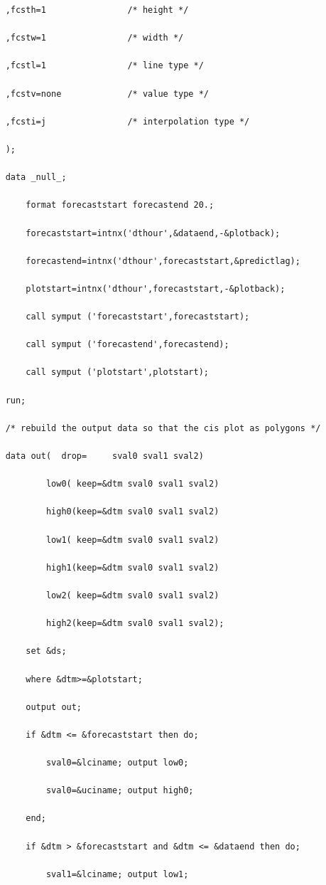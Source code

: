 \documentclass[10pt]{sugconf-ish}
\begin{document}
\begin{verbatim}
    ,fcsth=1                /* height */

    ,fcstw=1                /* width */

    ,fcstl=1                /* line type */

    ,fcstv=none             /* value type */

    ,fcsti=j                /* interpolation type */

    );  

    data _null_;

        format forecaststart forecastend 20.;

        forecaststart=intnx('dthour',&dataend,-&plotback);

        forecastend=intnx('dthour',forecaststart,&predictlag);

        plotstart=intnx('dthour',forecaststart,-&plotback); 

        call symput ('forecaststart',forecaststart);

        call symput ('forecastend',forecastend);

        call symput ('plotstart',plotstart);

    run;

    /* rebuild the output data so that the cis plot as polygons */

    data out(  drop=     sval0 sval1 sval2)

            low0( keep=&dtm sval0 sval1 sval2)

            high0(keep=&dtm sval0 sval1 sval2)

            low1( keep=&dtm sval0 sval1 sval2)

            high1(keep=&dtm sval0 sval1 sval2)

            low2( keep=&dtm sval0 sval1 sval2)

            high2(keep=&dtm sval0 sval1 sval2);

        set &ds;

        where &dtm>=&plotstart;

        output out;

        if &dtm <= &forecaststart then do;

            sval0=&lciname; output low0; 

            sval0=&uciname; output high0;

        end;

        if &dtm > &forecaststart and &dtm <= &dataend then do; 

            sval1=&lciname; output low1; 


\end{verbatim}
\end{document}
